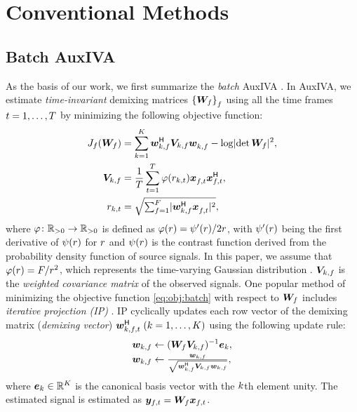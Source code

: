 \documentclass[sip,biber]{now-journal}
\begin{document}
\section{Conventional Methods}\label{sec:conventional}

\subsection{Batch AuxIVA}
As the basis of our work, we first summarize the \emph{batch} AuxIVA \cite{Ono:2011:WASPAA}.
In AuxIVA, we estimate \emph{time-invariant} demixing matrices ${\{\bm{W} _{f}\}} _{f}$ using all the time frames $t = 1, \dots, T$ by minimizing the following objective function:
\begin{align}
  J _{\freq}(\Demix _{\freq}) &= \sum _{\src = 1} ^{\Src} \demix _{\src,\freq} ^{\hermite} \cov _{\src,\freq} \demix _{\src,\freq} ^{\nohermite} - \logdet{\Demix _{\freq}} ^2, \label{eq:obj:batch} \\
  \cov _{\src,\freq} &= \frac{1}{\Tframe} \sum _{\tframe = 1} ^{\Tframe} \weight(\var _{\src,\tframe}) \Obs _{\ft} ^{\nohermite} \Obs _{\ft} ^{\hermite}, \label{eq:cov:batch} \\
  \var _{\src,\tframe} &= \textstyle\sqrt{\sum _{\freq=1} ^{\Freq} \lvert \demix ^{\hermite} _{\src,\freq} \Obs ^{\nohermite}_{\ft} \rvert ^2} \label{eq:var:batch},
\end{align}
where
$\varphi\colon \mathbb{R} _{>0} \to \mathbb{R} _{>0}$ is defined as $\varphi(r) = \psi ' (r) / 2 r$, with $\psi '(r)$ being the first derivative of $\psi (r)$ for $r$
and $\psi(r)$ is the contrast function derived from the probability density function of source signals.
In this paper, we assume that $\varphi (r) = F/{r ^2}$, which represents the time-varying Gaussian distribution \cite{Ono:2012:APSIPA}.
$\bm{V} _{k,f}$ is the \emph{weighted covariance matrix} of the observed signals.
One popular method of minimizing the objective function \eqref{eq:obj:batch} with respect to $\bm{W} _{f}$ includes \emph{iterative projection (IP)} \cite{Ono:2011:WASPAA}.
IP cyclically updates each row vector of the demixing matrix (\emph{demixing vector}) $\demix _{\src,\ft} ^{\hermite}\; (\src = 1, \dots, \Src)$ using the following update rule:
\begin{align}
  \bm{w} _{k,f} &\gets (\bm{W} _{f} \bm{V} _{k,f}) ^{-1} \bm{e} _{k} \label{eq:ip:proj}, \\
  \bm{w} _{k,f} &\gets \tfrac{{\bm{w} _{k,f}}}{{\sqrt{\bm{w} _{k,f} ^{\mathsf{H}} \bm{V} _{k,f} \bm{w} _{k,f}}}} \label{eq:ip:norm},
\end{align}
where $\bm{e} _{k} \in \mathbb{R} ^{K}$ is the canonical basis vector with the $k$th element unity.
The estimated signal is estimated as $\Est _{\ft} = \Demix _{\freq} \Obs _{\ft}$.
\end{document}
